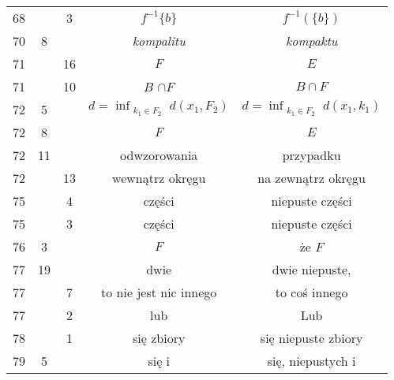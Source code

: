 \documentclass[a4paper,11pt]{article}
\numberwithin{equation}{section}
\begin{document}
\begin{center}
\begin{tabular}{|c|c|c|c|c|}
    68  & &  3 & $f^{ -1 } \{ b \}$ & $f^{ -1 }( \{ b \} )$ \\
    70  &  8 & & \textit{kompalitu} & \textit{kompaktu} \\
    71  & & 16 & $F$ & $E$ \\
    71  & & 10 & $B$ $\cap F$ & $B \cap F$ \\
    72  &  5 & & $d = \inf_{ \substack{ k_{ 1 } \in F_{ 2 } } }
                 d( x_{ 1 }, F_{ 2 } )$
           & $d = \inf_{ \substack{ k_{ 1 } \in F_{ 2 } } }
             d( x_{ 1 }, k_{ 1 } )$ \\
    72  &  8 & & $F$ & $E$ \\
    72  & 11 & & odwzorowania & przypadku \\
    72  & & 13 & wewnątrz okręgu & na zewnątrz okręgu \\
    75  & &  4 & części & niepuste części \\
    75  & &  3 & części & niepuste części \\
    76  &  3 & & $F$ & że $F$ \\
    77  & 19 & & dwie & dwie niepuste, \\
    77  & &  7 & to nie jest nic innego & to coś innego \\
    77  & &  2 & lub & Lub \\
    78  & &  1 & się zbiory & się niepuste zbiory \\
    79  &  5 & & się i & się, niepustych i \\
    \hline
  \end{tabular}






\end{center}
\end{document}
